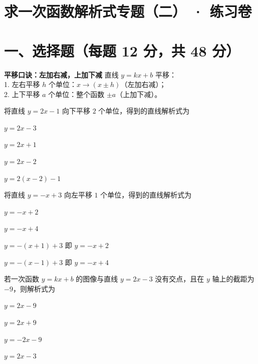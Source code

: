 \documentclass{exam-zh}
\begin{document}
\section*{求一次函数解析式专题（二） · 练习卷}

\section*{一、选择题（每题 12 分，共 48 分）}


\begin{keyideabox}
  \textbf{平移口诀：左加右减，上加下减}
  直线 $y=kx+b$ 平移：\\ 1. 左右平移 $h$ 个单位：$x \to (x \pm h)$（左加右减）；\\ 2. 上下平移 $a$ 个单位：整个函数 $\pm a$（上加下减）。
\end{keyideabox}



\begin{question}[points=12]
  将直线 $y = 2x - 1$ 向下平移 $2$ 个单位，得到的直线解析式为
  \begin{choices}
    \item $y = 2x - 3$
    \item $y = 2x + 1$
    \item $y = 2x - 2$
    \item $y = 2(x - 2) - 1$
  \end{choices}
\end{question}



\begin{question}[points=12]
  将直线 $y = -x + 3$ 向左平移 $1$ 个单位，得到的直线解析式为
  \begin{choices}
    \item $y = -x + 2$
    \item $y = -x + 4$
    \item $y = -(x + 1) + 3$ 即 $y = -x + 2$
    \item $y = -(x - 1) + 3$ 即 $y = -x + 4$
  \end{choices}
\end{question}



\begin{question}[points=12]
  若一次函数 $y = kx + b$ 的图像与直线 $y = 2x - 3$ 没有交点，且在 $y$ 轴上的截距为 $-9$，则解析式为
  \begin{choices}
    \item $y = 2x - 9$
    \item $y = 2x + 9$
    \item $y = -2x - 9$
    \item $y = 2x - 3$
  \end{choices}
\end{question}
\end{document}
